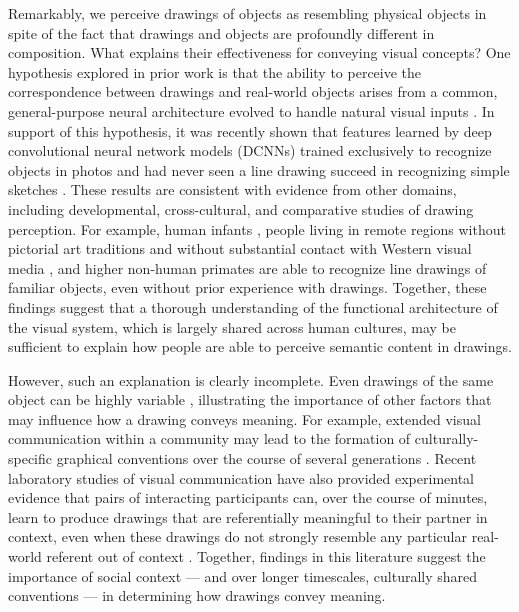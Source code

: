 \documentclass[9pt,twocolumn,twoside]{pnas-new}
\begin{document}
Remarkably, we perceive drawings of objects as resembling physical objects in spite of the fact that drawings and objects are profoundly different in composition. What explains their effectiveness for conveying visual concepts? One hypothesis explored in prior work is that the ability to perceive the correspondence between drawings and real-world objects arises from a common, general-purpose neural architecture evolved to handle natural visual inputs \cite{Sayim:2011bz,gibson2014ecological}. In support of this hypothesis, it was recently shown that features learned by deep convolutional neural network models (DCNNs) trained exclusively to recognize objects in photos and had never seen a line drawing succeed in recognizing simple sketches \cite{FanCommon2018,yamins2014performance}. These results are consistent with evidence from other domains, including developmental, cross-cultural, and comparative studies of drawing perception. For example, human infants \cite{hochberg1962pictorial}, people living in remote regions without pictorial art traditions and without substantial contact with Western visual media \cite{kennedy1975outline}, and higher non-human primates \cite{tanaka2007recognition} are able to recognize line drawings of familiar objects, even without prior experience with drawings. Together, these findings suggest that a thorough understanding of the functional architecture of the visual system, which is largely shared across human cultures, may be sufficient to explain how people are able to perceive semantic content in drawings.

However, such an explanation is clearly incomplete. Even drawings of the same object can be highly variable \cite{quickdraw2017}, illustrating the importance of other factors that may influence how a drawing conveys meaning. For example, extended visual communication within a community may lead to the formation of culturally-specific graphical conventions over the course of several generations \cite{toku2001cross,boltz1994origin}. Recent laboratory studies of visual communication have also provided experimental evidence that pairs of interacting participants can, over the course of minutes, learn to produce drawings that are referentially meaningful to their partner in context, even when these drawings do not strongly resemble any particular real-world referent out of context \cite{Garrod:2007wk,fay2010interactive,Galantucci:2005uh,Healey:2007vq}. Together, findings in this literature suggest the importance of social context --- and over longer timescales, culturally shared conventions --- in determining how drawings convey meaning.
\end{document}
